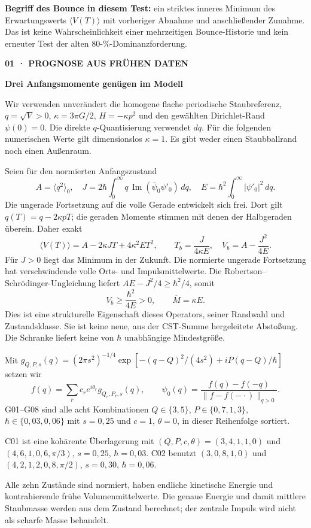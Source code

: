 \documentclass[11pt,a4paper]{article}
\newcommand{\kicker}[1]{{\sffamily\small\bfseries\color{teal}#1}\par}
\newcommand{\tit}[1]{{\sffamily\LARGE\bfseries\color{ink}#1}\par\vspace{6pt}}
\newcommand{\sect}[1]{\par\vspace{6pt}{\sffamily\large\bfseries\color{ink}#1}\par}
\newcommand{\note}[1]{\par\vspace{4pt}\colorbox{pale}{\parbox{\dimexpr\linewidth-2\fboxsep}{#1}}\par}
\begin{document}
\note{\textbf{Begriff des Bounce in diesem Test:} ein striktes inneres Minimum des Erwartungswerts $\langle V(T)\rangle$ mit vorheriger Abnahme und anschließender Zunahme. Das ist keine Wahrscheinlichkeit einer mehrzeitigen Bounce-Historie und kein erneuter Test der alten 80-\%-Dominanzforderung.}

\newpage
\kicker{01 · PROGNOSE AUS FRÜHEN DATEN}
\tit{Drei Anfangsmomente genügen im Modell}
Wir verwenden unverändert die homogene flache periodische Staubreferenz, $q=\sqrt V>0$, $\kappa=3\pi G/2$, $H=-\kappa p^2$ und den gewählten Dirichlet-Rand $\psi(0)=0$. Die direkte $q$-Quantisierung verwendet $dq$. Für die folgenden numerischen Werte gilt dimensionslos $\kappa=1$. Es gibt weder einen Staubballrand noch einen Außenraum.

Seien für den normierten Anfangszustand
\[
 A=\langle q^2\rangle_0,\quad
 J=2\hbar\int_0^\infty q\,\operatorname{Im}(\overline\psi_0\psi'_0)\,dq,
 \quad E=\hbar^2\int_0^\infty|\psi'_0|^2\,dq.
\]
Die ungerade Fortsetzung auf die volle Gerade entwickelt sich frei. Dort gilt $q(T)=q-2\kappa pT$; die geraden Momente stimmen mit denen der Halbgeraden überein. Daher exakt
\[
 \langle V(T)\rangle=A-2\kappa JT+4\kappa^2ET^2,
 \qquad \boxed{T_b=\frac{J}{4\kappa E},\quad V_b=A-\frac{J^2}{4E}}.
\]
Für $J>0$ liegt das Minimum in der Zukunft. Die normierte ungerade Fortsetzung hat verschwindende volle Orts- und Impulsmittelwerte. Die Robertson--Schrödinger-Ungleichung liefert $AE-J^2/4\ge\hbar^2/4$, somit
\[
 V_b\ge\frac{\hbar^2}{4E}>0,\qquad \overline M=\kappa E.
\]
Dies ist eine strukturelle Eigenschaft dieses Operators, seiner Randwahl und Zustandsklasse. Sie ist keine neue, aus der CST-Summe hergeleitete Abstoßung. Die Schranke liefert keine von $\hbar$ unabhängige Mindestgröße.

\sect{Vorher festgelegte neue Präparationen}
Mit $g_{Q,P,s}(q)=(2\pi s^2)^{-1/4}\exp[-(q-Q)^2/(4s^2)+iP(q-Q)/\hbar]$ setzen wir
\[
 f(q)=\sum_r c_r e^{i\theta_r}g_{Q_r,P_r,s}(q),\qquad
 \psi_0(q)=\frac{f(q)-f(-q)}{\|f-f(-\cdot)\|_{q>0}}.
\]
G01--G08 sind alle acht Kombinationen $Q\in\{3,5\}$, $P\in\{0{,}7,1{,}3\}$, $\hbar\in\{0{,}03,0{,}06\}$ mit $s=0{,}25$ und $c=1$, $\theta=0$, in dieser Reihenfolge sortiert.

C01 ist eine kohärente Überlagerung mit $(Q,P,c,\theta)=(3{,}4,1,1,0)$ und $(4{,}6,1,0{,}6,\pi/3)$, $s=0{,}25$, $\hbar=0{,}03$. C02 benutzt $(3,0{,}8,1,0)$ und $(4{,}2,1{,}2,0{,}8,\pi/2)$, $s=0{,}30$, $\hbar=0{,}06$.

Alle zehn Zustände sind normiert, haben endliche kinetische Energie und kontrahierende frühe Volumenmittelwerte. Die genaue Energie und damit mittlere Staubmasse werden aus dem Zustand berechnet; der zentrale Impuls wird nicht als scharfe Masse behandelt.
\end{document}
